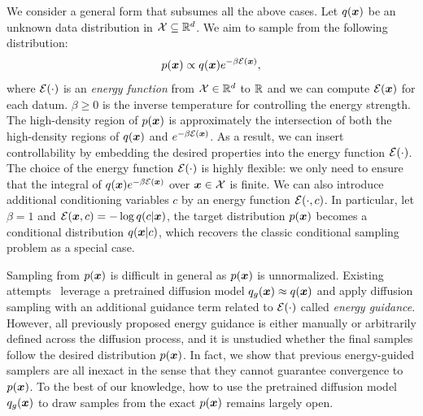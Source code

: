 We consider a general form that subsumes all the above cases. Let $q({\bm{x}})$ be an unknown data distribution in ${\mathcal{X}}\subseteq \mathbb{R}^d$. We aim to sample from the following distribution:
\begin{equation}
\label{Eq:target_distribution_intro}
    p({\bm{x}}) \propto q({\bm{x}})e^{-\beta{\mathcal{E}}({\bm{x}})},
\end{equation}
where ${\mathcal{E}}(\cdot)$ is an \textit{energy function} from $\mathcal X\in \mathbb{R}^d$ to $\mathbb{R}$ and we can compute ${\mathcal{E}}({\bm{x}})$ for each datum. $\beta \geq 0$ is the inverse temperature for controlling the energy strength. 
The high-density region of $p({\bm{x}})$ is approximately the intersection of both the high-density regions of $q({\bm{x}})$ and $e^{-\beta{\mathcal{E}}({\bm{x}})}$. As a result, we can insert controllability by embedding the desired properties into the energy function ${\mathcal{E}}(\cdot)$. 
The choice of the energy function ${\mathcal{E}}(\cdot)$ is highly flexible: we only need to ensure that the integral of $q({\bm{x}})e^{-\beta{\mathcal{E}}({\bm{x}})}$ over ${\bm{x}}\in{\mathcal{X}}$ is finite.
We can also introduce additional conditioning variables $c$ by an energy function ${\mathcal{E}}(\cdot, c)$.
In particular, let $\beta=1$ and ${\mathcal{E}}({\bm{x}},c) = -\log q(c|{\bm{x}})$, the target distribution $p({\bm{x}})$ becomes a conditional distribution $q({\bm{x}}|c)$, which recovers the classic conditional sampling problem as a special case.











Sampling from $p({\bm{x}})$ is difficult in general as $p({\bm{x}})$ is unnormalized.
Existing attempts~\citep{diffuser, zhao2022egsde,ho2022video,chung2022diffusion,kawar2022denoising} leverage a pretrained diffusion model $q_g({\bm{x}})\approx q({\bm{x}})$ and apply diffusion sampling with an additional guidance term related to ${\mathcal{E}}(\cdot)$ called \textit{energy guidance}.
However, all previously proposed energy guidance is either manually or arbitrarily defined across the diffusion process, and it is unstudied whether the final samples follow the desired distribution $p({\bm{x}})$. In fact, we show that previous energy-guided samplers are all inexact in the sense that they cannot guarantee convergence to $p({\bm{x}})$.
To the best of our knowledge, how to use the pretrained diffusion model $q_g({\bm{x}})$ to draw samples from the exact $p({\bm{x}})$ remains largely open.%


